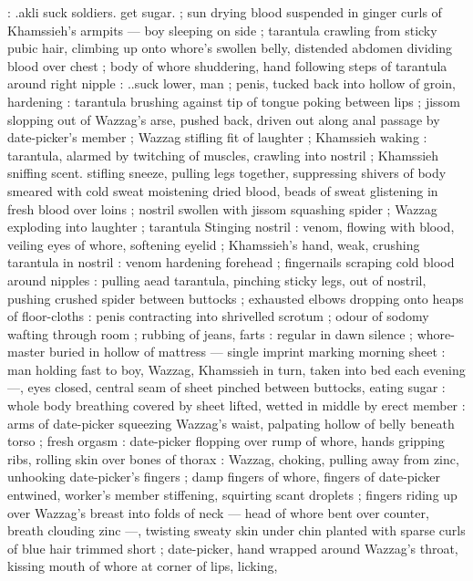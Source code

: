 :{\gl} .akli{\td} suck soldiers. get sugar. {\gr} ; sun drying blood suspended 
in ginger curls of Khamssieh's armpits --- boy sleeping on side ; 
tarantula crawling from sticky pubic hair, climbing up onto whore's 
swollen belly, distended abdomen dividing blood over chest ; body of 
whore shuddering, hand following steps of tarantula around right 
nipple : {\gl} ..suck lower, man{\td} {\gr} ; penis, tucked back into hollow of 
groin, hardening : tarantula brushing against tip of tongue poking 
between lips ; jissom slopping out of Wazzag's arse, pushed back, 
driven out along anal passage by date-picker's member ; Wazzag 
stifling fit of laughter ; Khamssieh waking : tarantula, alarmed by 
twitching of muscles, crawling into nostril ; Khamssieh sniffing scent. 
stifling sneeze, pulling legs together, suppressing shivers of body 
smeared with cold sweat moistening dried blood, beads of sweat 
glistening in fresh blood over loins ; nostril swollen with jissom 
squashing spider ; Wazzag exploding into laughter ; tarantula 
Stinging nostril : venom, flowing with blood, veiling eyes of whore, 
softening eyelid ; Khamssieh's hand, weak, crushing tarantula in 
nostril : venom hardening forehead ; fingernails scraping cold blood 
around nipples : pulling aead tarantula, pinching sticky legs, out of 
nostril, pushing crushed spider between buttocks ; exhausted elbows 
dropping onto heaps of floor-cloths : penis contracting into 
shrivelled scrotum ; odour of sodomy wafting through room ; rubbing 
of jeans, farts : regular in dawn silence ; whore-master buried in 
hollow of mattress --- single imprint marking morning sheet : man 
holding fast to boy, Wazzag, Khamssieh in turn, taken into bed each 
evening ---, eyes closed, central seam of sheet pinched between 
buttocks, eating sugar : whole body breathing covered by sheet 
lifted, wetted in middle by erect member : arms of date-picker 
squeezing Wazzag's waist, palpating hollow of belly beneath torso ; 
fresh orgasm : date-picker flopping over rump of whore, hands 
gripping ribs, rolling skin over bones of thorax : Wazzag, choking, 
pulling away from zinc, unhooking date-picker's fingers ; damp 
fingers of whore, fingers of date-picker entwined, worker's member 
stiffening, squirting scant droplets ; fingers riding up over Wazzag's 
breast into folds of neck --- head of whore bent over counter, breath 
clouding zinc ---, twisting sweaty skin under chin planted with sparse 
curls of blue hair trimmed short ; date-picker, hand wrapped around 
Wazzag's throat, kissing mouth of whore at corner of lips, licking, 
